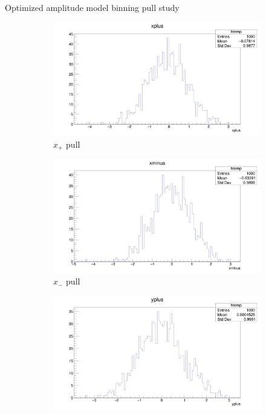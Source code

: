 \documentclass{beamer}
\begin{document}
\begin{frame}{Optimized amplitude model binning pull study}
  \begin{figure}
    \centering
    \vspace{-0.2cm}
    \begin{subfigure}{0.5\textwidth}
      \includegraphics[width = 1.0\textwidth]{OptimizedAmplitudePulls/xplus1K1K.png}
      \caption{$x_+$ pull}
    \end{subfigure}%
    \begin{subfigure}{0.5\textwidth}
      \includegraphics[width = 1.0\textwidth]{OptimizedAmplitudePulls/xminus1K1K.png}
      \caption{$x_-$ pull}
    \end{subfigure}
    \begin{subfigure}{0.5\textwidth}
      \includegraphics[width = 1.0\textwidth]{OptimizedAmplitudePulls/yplus1K1K.png}

\end{subfigure}
\end{figure}
\end{frame}
\end{document}
